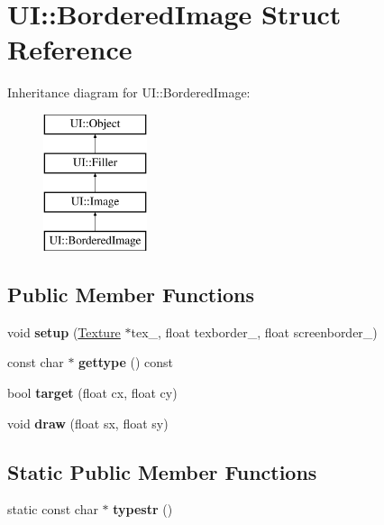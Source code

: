 \hypertarget{struct_u_i_1_1_bordered_image}{}\section{UI\+:\+:Bordered\+Image Struct Reference}
\label{struct_u_i_1_1_bordered_image}
Inheritance diagram for UI\+:\+:Bordered\+Image\+:\begin{figure}[H]
\begin{center}
\leavevmode
\includegraphics[height=4.000000cm]{struct_u_i_1_1_bordered_image}
\end{center}
\end{figure}
\subsection*{Public Member Functions}
\begin{DoxyCompactItemize}
\item 
\mbox{\label{struct_u_i_1_1_bordered_image_a11361a1d4292d5c02358ca1defd5e89f}} 
void {\bfseries setup} (\hyperlink{struct_texture}{Texture} $\ast$tex\+\_\+, float texborder\+\_\+, float screenborder\+\_\+)
\item 
\mbox{\label{struct_u_i_1_1_bordered_image_a1c4c42ec131df0b6d7a53ace42d84f5a}} 
const char $\ast$ {\bfseries gettype} () const
\item 
\mbox{\label{struct_u_i_1_1_bordered_image_ae0c062b65f37363cc2fa092324705cbf}} 
bool {\bfseries target} (float cx, float cy)
\item 
\mbox{\label{struct_u_i_1_1_bordered_image_a4f1aae7577b5a4428633589c1bf1f08f}} 
void {\bfseries draw} (float sx, float sy)
\end{DoxyCompactItemize}
\subsection*{Static Public Member Functions}
\begin{DoxyCompactItemize}
\item 
\mbox{\label{struct_u_i_1_1_bordered_image_afa941a22d447e9812109b0a3091eb9c4}} 
static const char $\ast$ {\bfseries typestr} ()
\end{DoxyCompactItemize}
